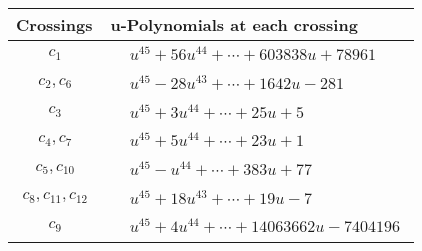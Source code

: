 \documentclass[1p]{elsarticle_modified}
\theoremstyle{definition}
\begin{document}
\begin{tabular}{m{50pt}|m{274pt}}
Crossings & \hspace{64pt}u-Polynomials at each crossing \\
\hline $$\begin{aligned}c_{1}\end{aligned}$$&$\begin{aligned}
&u^{45}+56 u^{44}+\cdots+603838 u+78961
\end{aligned}$\\
\hline $$\begin{aligned}c_{2},c_{6}\end{aligned}$$&$\begin{aligned}
&u^{45}-28 u^{43}+\cdots+1642 u-281
\end{aligned}$\\
\hline $$\begin{aligned}c_{3}\end{aligned}$$&$\begin{aligned}
&u^{45}+3 u^{44}+\cdots+25 u+5
\end{aligned}$\\
\hline $$\begin{aligned}c_{4},c_{7}\end{aligned}$$&$\begin{aligned}
&u^{45}+5 u^{44}+\cdots+23 u+1
\end{aligned}$\\
\hline $$\begin{aligned}c_{5},c_{10}\end{aligned}$$&$\begin{aligned}
&u^{45}- u^{44}+\cdots+383 u+77
\end{aligned}$\\
\hline $$\begin{aligned}c_{8},c_{11},c_{12}\end{aligned}$$&$\begin{aligned}
&u^{45}+18 u^{43}+\cdots+19 u-7
\end{aligned}$\\
\hline $$\begin{aligned}c_{9}\end{aligned}$$&$\begin{aligned}
&u^{45}+4 u^{44}+\cdots+14063662 u-7404196
\end{aligned}$\\
\hline
\end{tabular}\\~\\
\newpage\renewcommand{\arraystretch}{1}
\end{document}
